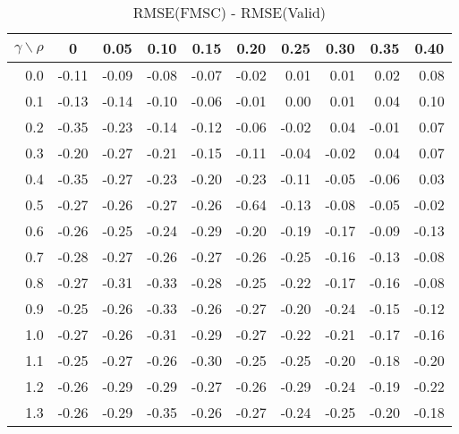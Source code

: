 \documentclass[12pt]{article}
\begin{document}
%
\begin{table}[!tbp]
\caption{RMSE(FMSC) - RMSE(Valid)}
 \begin{center}
 \begin{tabular}{r|rrrrrrrrr}\hline\hline
\multicolumn{1}{c|}{$\gamma\backslash\rho$}&\multicolumn{1}{c}{0}&\multicolumn{1}{c}{0.05}&\multicolumn{1}{c}{0.10}&\multicolumn{1}{c}{0.15}&\multicolumn{1}{c}{0.20}&\multicolumn{1}{c}{0.25}&\multicolumn{1}{c}{0.30}&\multicolumn{1}{c}{0.35}&\multicolumn{1}{c}{0.40}\tabularnewline
\hline
0.0&-0.11&-0.09&-0.08&-0.07&-0.02& 0.01& 0.01& 0.02& 0.08\tabularnewline
0.1&-0.13&-0.14&-0.10&-0.06&-0.01& 0.00& 0.01& 0.04& 0.10\tabularnewline
0.2&-0.35&-0.23&-0.14&-0.12&-0.06&-0.02& 0.04&-0.01& 0.07\tabularnewline
0.3&-0.20&-0.27&-0.21&-0.15&-0.11&-0.04&-0.02& 0.04& 0.07\tabularnewline
0.4&-0.35&-0.27&-0.23&-0.20&-0.23&-0.11&-0.05&-0.06& 0.03\tabularnewline
0.5&-0.27&-0.26&-0.27&-0.26&-0.64&-0.13&-0.08&-0.05&-0.02\tabularnewline
0.6&-0.26&-0.25&-0.24&-0.29&-0.20&-0.19&-0.17&-0.09&-0.13\tabularnewline
0.7&-0.28&-0.27&-0.26&-0.27&-0.26&-0.25&-0.16&-0.13&-0.08\tabularnewline
0.8&-0.27&-0.31&-0.33&-0.28&-0.25&-0.22&-0.17&-0.16&-0.08\tabularnewline
0.9&-0.25&-0.26&-0.33&-0.26&-0.27&-0.20&-0.24&-0.15&-0.12\tabularnewline
1.0&-0.27&-0.26&-0.31&-0.29&-0.27&-0.22&-0.21&-0.17&-0.16\tabularnewline
1.1&-0.25&-0.27&-0.26&-0.30&-0.25&-0.25&-0.20&-0.18&-0.20\tabularnewline
1.2&-0.26&-0.29&-0.29&-0.27&-0.26&-0.29&-0.24&-0.19&-0.22\tabularnewline
1.3&-0.26&-0.29&-0.35&-0.26&-0.27&-0.24&-0.25&-0.20&-0.18\tabularnewline
\hline
\end{tabular}

\end{center}

\end{table}
\end{document}
